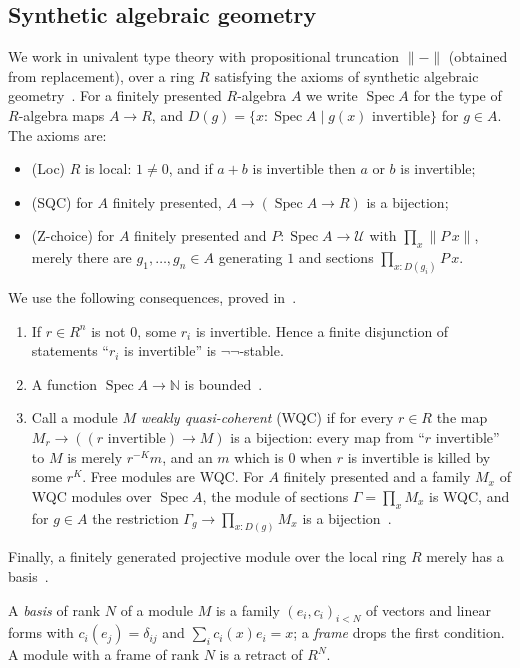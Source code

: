 \documentclass[11pt]{amsart}
\theoremstyle{definition}
\theoremstyle{remark}
\newcommand{\Spec}{\operatorname{Spec}}
\newcommand{\tr}[1]{\|#1\|}
\newcommand{\N}{\mathbb N}
\newcommand{\U}{\mathcal U}
\begin{document}
\subsection{Synthetic algebraic geometry}
We work in univalent type theory with propositional truncation $\tr{-}$
(obtained from replacement), over a ring $R$ satisfying the axioms of
synthetic algebraic geometry~\cite{CCH}. For a finitely presented
$R$-algebra $A$ we write $\Spec A$ for the type of $R$-algebra maps
$A\to R$, and $D(g)=\{x:\Spec A\mid g(x)\text{ invertible}\}$ for $g\in A$.
The axioms are:
\begin{itemize}
\item (Loc) $R$ is local: $1\neq0$, and if $a+b$ is invertible then $a$ or
  $b$ is invertible;
\item (SQC) for $A$ finitely presented, $A\to(\Spec A\to R)$ is a bijection;
\item (Z-choice) for $A$ finitely presented and $P:\Spec A\to\U$ with
  $\prod_x\tr{P\,x}$, merely there are $g_1,\dots,g_n\in A$ generating $1$
  and sections $\prod_{x:D(g_i)}P\,x$.
\end{itemize}
We use the following consequences, proved in~\cite{CCH}.
\begin{enumerate}
\item[(F1)] If $r\in R^n$ is not $0$, some $r_i$ is invertible. Hence a
  finite disjunction of statements ``$r_i$ is invertible'' is
  $\neg\neg$-stable.
\item[(F2)] A function $\Spec A\to\N$ is bounded~\cite[3.3.3]{CCH}.
\item[(F3)] Call a module $M$ \emph{weakly quasi-coherent} (WQC) if for
  every $r\in R$ the map $M_r\to((r\text{ invertible})\to M)$ is a
  bijection: every map from ``$r$ invertible'' to $M$ is merely
  $r^{-K}m$, and an $m$ which is $0$ when $r$ is invertible is killed
  by some $r^K$. Free modules are WQC. For $A$ finitely presented and a
  family $M_x$ of WQC modules over $\Spec A$, the module of sections
  $\Gamma=\prod_xM_x$ is WQC, and for $g\in A$ the restriction
  $\Gamma_g\to\prod_{x:D(g)}M_x$ is a bijection~\cite[7.1.8,
  7.1.10]{CCH}.
\end{enumerate}
Finally, a finitely generated projective module over the local ring $R$
merely has a basis~\cite{LQ}.

A \emph{basis} of rank $N$ of a module $M$ is a family $(e_i,c_i)_{i<N}$
of vectors and linear forms with $c_i(e_j)=\delta_{ij}$ and
$\sum_ic_i(x)e_i=x$; a \emph{frame} drops the first condition. A module
with a frame of rank $N$ is a retract of $R^N$.
\end{document}

